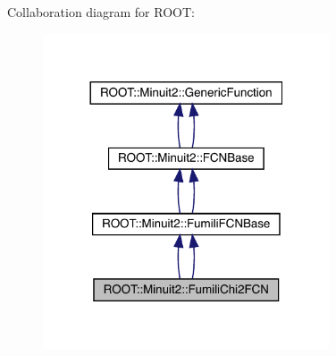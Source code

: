 Collaboration diagram for R\+O\+OT\+:\nopagebreak
\begin{figure}[H]
\begin{center}
\leavevmode
\includegraphics[width=240pt]{dd/d49/classROOT_1_1Minuit2_1_1FumiliChi2FCN__coll__graph}
\end{center}
\end{figure}
